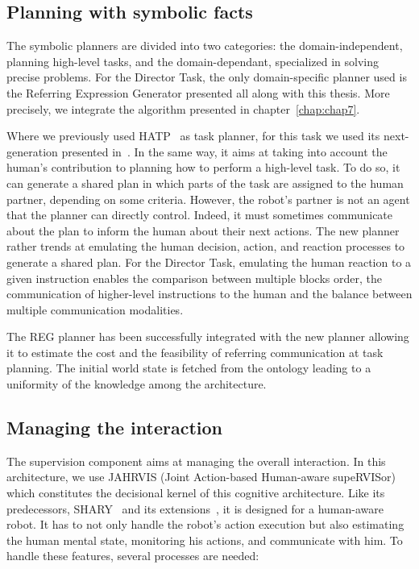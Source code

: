 \subsection{Planning with symbolic facts}

The symbolic planners are divided into two categories: the domain-independent, planning high-level tasks, and the domain-dependant, specialized in solving precise problems. For the Director Task, the only domain-specific planner used is the Referring Expression Generator presented all along with this thesis. More precisely, we integrate the algorithm presented in chapter~\ref{chap:chap7}.

Where we previously used HATP~\cite{lallement_2014_hatp} as task planner, for this task we used its next-generation presented in~\cite{buisan_2021_human}. In the same way, it aims at taking into account the human's contribution to planning how to perform a high-level task. To do so, it can generate a shared plan in which parts of the task are assigned to the human partner, depending on some criteria. However, the robot's partner is not an agent that the planner can directly control. Indeed, it must sometimes communicate about the plan to inform the human about their next actions. The new planner rather trends at emulating the human decision, action, and reaction processes to generate a shared plan. For the Director Task, emulating the human reaction to a given instruction enables the comparison between multiple blocks order, the communication of higher-level instructions to the human and the balance between multiple communication modalities.

The REG planner has been successfully integrated with the new planner allowing it to estimate the cost and the feasibility of referring communication at task planning. The initial world state is fetched from the ontology leading to a uniformity of the knowledge among the architecture.

\subsection{Managing the interaction}

The supervision component aims at managing the overall interaction. In this architecture, we use JAHRVIS (Joint Action-based Human-aware supeRVISor) which constitutes the decisional kernel of this cognitive architecture. Like its predecessors, SHARY~\cite{clodic_2009_shary} and its extensions~\cite{fiore_2016_planning, devin_2016_implemented}, it is designed for a human-aware robot. It has to not only handle the robot's action execution but also estimating the human mental state, monitoring his actions, and communicate with him. To handle these features, several processes are needed:

